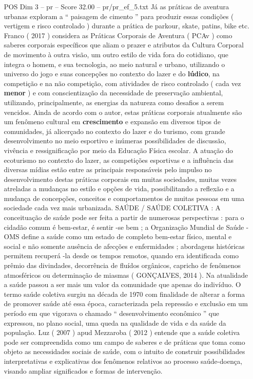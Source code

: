 \begin{textsample}{POS Dim 3 – pr – Score 32.00 – pr/pr\_ef\_5.txt}
Já as práticas de aventura urbanas exploram a “ paisagem de cimento ” para produzir essas condições ( vertigem e risco controlado ) durante a prática de parkour, skate, patins, bike etc.
Franco ( 2017 ) considera as Práticas Corporais de Aventura ( PCAv ) como saberes corporais específicos que aliam o prazer e atributos da Cultura Corporal de movimento à outra visão, um outro estilo de vida fora do cotidiano, que integra o homem, e sua tecnologia, ao meio natural e urbano, utilizando o universo do jogo e suas concepções no contexto do lazer e do \textbf{lúdico}, na competição e na não competição, com atividades de risco controlado ( cada vez \textbf{menor} ) e com conscientização da necessidade de preservação ambiental, utilizando, principalmente, as energias da natureza como desafios a serem vencidos.
Ainda de acordo com o autor, estas práticas corporais atualmente são um fenômeno cultural em \textbf{crescimento} e expansão em diversos tipos de comunidades, já alicerçado no contexto do lazer e do turismo, com grande desenvolvimento no meio esportivo e inúmeras possibilidades de discussão, vivência e ressignificação por meio da Educação Física escolar.
A atuação do ecoturismo no contexto do lazer, as competições esportivas e a influência das diversas mídias estão entre as principais responsáveis pelo impulso no desenvolvimento destas práticas corporais em muitas sociedades, muitas vezes atreladas a mudanças no estilo e opções de vida, possibilitando a reflexão e a mudança de concepções, conceitos e comportamentos de muitas pessoas em uma sociedade cada vez mais urbanizada.
SAÚDE / SAÚDE COLETIVA : A conceituação de saúde pode ser feita a partir de numerosas perspectivas : para o cidadão comum é bem-estar, é sentir -se bem ; a Organização Mundial de Saúde - OMS define a saúde como um estado de completo bem-estar físico, mental e social e não somente ausência de afecções e enfermidades ; abordagens históricas permitem recuperá -la desde os tempos remotos, quando era identificada como prêmio das divindades, decorrência de fluídos orgânicos, capricho de fenômenos atmosféricos ou determinação de miasmas ( GONÇALVES, 2014 ).
Na atualidade a saúde passou a ser mais um valor da comunidade que apenas do indivíduo.
O termo saúde coletiva surgiu na década de 1970 com finalidade de alterar a forma de promover saúde até essa época, caracterizada pela repressão e exclusão em um período em que vigorava o chamado “ desenvolvimento econômico ” que expressou, no plano social, uma queda na qualidade de vida e da saúde da população.
Luz ( 2007 ) apud Mezzaroba ( 2012 ) entende que a saúde coletiva pode ser compreendida como um campo de saberes e de práticas que toma como objeto as necessidades sociais de saúde, com o intuito de construir possibilidades interpretativas e explicativas dos fenômenos relativos ao processo saúde-doença, visando ampliar significados e formas de intervenção.

\end{textsample}
